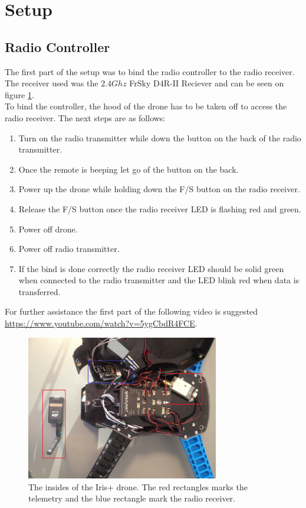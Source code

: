 \section{Setup}
\subsection*{Radio Controller}
The first part of the setup was to bind the radio controller to the radio receiver. The receiver
used was the $2.4 Ghz$ FrSky D4R-II Reciever \cite{Ref:FrSky} and can be seen on figure
\ref{fig:irisInside}.
\\
To bind the controller, the hood of the drone has to be taken off to access the radio receiver.
The next steps are as follows:
\begin{enumerate}
\item Turn on the radio transmitter while down the button on the back of the radio transmitter.
\item Once the remote is beeping let go of the button on the back.
\item Power up the drone while holding down the F/S button on the radio receiver.
\item Release the F/S button once the radio receiver LED is flashing red and green.
\item Power off drone.
\item Power off radio transmitter.
\item If the bind is done correctly the radio receiver LED should be solid green when connected
to the radio transmitter and the LED blink red when data is transferred.
\end{enumerate}
For further assistance the first part of the following video is suggested
\url{https://www.youtube.com/watch?v=5ygCbdR4FCE}.

\begin{figure}[H]
  \centering
    \includegraphics[width=0.75\textwidth]{./Images/insideIRIS}
\caption{The insides of the Iris+ drone. The red rectangles marks the telemetry and the blue
rectangle mark the radio receiver.}
  \label{fig:irisInside}
\end{figure}

